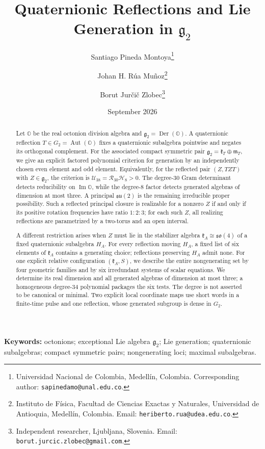 \documentclass[11pt,a4paper]{article}
\title{\textbf{Quaternionic Reflections and Lie Generation in $\mathfrak g_2$}}
\author{Santiago Pineda Montoya\thanks{Universidad Nacional de Colombia, Medell\'{i}n, Colombia. Corresponding author: \texttt{sapinedamo@unal.edu.co}.}
\and Johan H. R\'{u}a Mu\~{n}oz\thanks{Instituto de F\'{i}sica, Facultad de Ciencias Exactas y Naturales, Universidad de Antioquia, Medell\'{i}n, Colombia. Email: \texttt{heriberto.rua@udea.edu.co}.}
\and Borut Jur\v{c}i\v{c} Zlobec\thanks{Independent researcher, Ljubljana, Slovenia. Email: \texttt{borut.jurcic.zlobec@gmail.com}.}}
\date{September 2026}
\newcommand{\OO}{\mathbb O}
\newcommand{\Aut}{\operatorname{Aut}}
\newcommand{\Der}{\operatorname{Der}}
\begin{document}
\maketitle

\begin{abstract}
Let $\OO$ be the real octonion division algebra and $\mathfrak g_2=\Der(\OO)$.
A quaternionic reflection $T\in G_2=\Aut(\OO)$ fixes a quaternionic subalgebra pointwise and negates its orthogonal complement.
For the associated compact symmetric pair
$\mathfrak g_2=\mathfrak k_T\oplus\mathfrak m_T$, we give an explicit factored polynomial criterion for generation by an independently chosen even element and odd element.
Equivalently, for the reflected pair $(Z,TZT)$ with $Z\in\mathfrak g_2$, the criterion is
$\mathcal U_{38}=\mathcal R_{30}\mathcal H_8>0$.
The degree-$30$ Gram determinant detects reducibility on $\operatorname{Im}\OO$, while the degree-$8$ factor detects generated algebras of dimension at most three.
A principal $\mathfrak{su}(2)$ is the remaining irreducible proper possibility.
Such a reflected principal closure is realizable for a nonzero $Z$ if and only if its positive rotation frequencies have ratio $1:2:3$; for each such $Z$, all realizing reflections are parametrized by a two-torus and an open interval.

A different restriction arises when $Z$ must lie in the stabilizer algebra $\mathfrak k_A\cong\mathfrak{so}(4)$ of a fixed quaternionic subalgebra $H_A$.
For every reflection moving $H_A$, a fixed list of six elements of $\mathfrak k_A$ contains a generating choice; reflections preserving $H_A$ admit none.
For one explicit relative configuration $(\mathfrak k_A,S)$, we describe the entire nongenerating set by four geometric families and by six irredundant systems of scalar equations.
We determine its real dimension and all generated algebras of dimension at most three; a homogeneous degree-$34$ polynomial packages the six tests.
The degree is not asserted to be canonical or minimal.
Two explicit local coordinate maps use short words in a finite-time pulse and one reflection, whose generated subgroup is dense in $G_2$.
\end{abstract}

\noindent\textbf{Keywords:} octonions; exceptional Lie algebra $\mathfrak g_2$; Lie generation; quaternionic subalgebras; compact symmetric pairs; nongenerating loci; maximal subalgebras.
\end{document}
